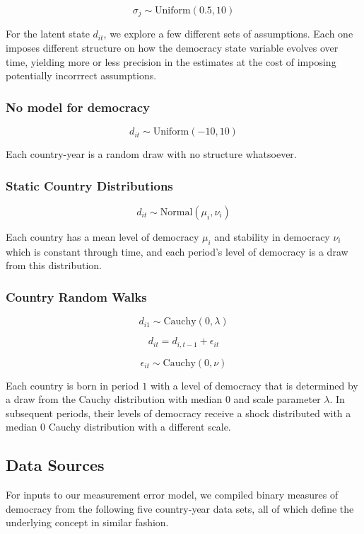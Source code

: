 \documentclass[letterpaper]{article}
\begin{document}
\[ \sigma_j \sim \mbox{Uniform}(0.5, 10) \]

For the latent state $d_{it}$, we explore a few different sets of assumptions.  Each one imposes different structure on how the democracy state variable evolves over time, yielding more or less precision in the estimates at the cost of imposing potentially incorrrect assumptions.

\subsubsection{No model for democracy}

\[
  d_{it} \sim \mbox{Uniform}(-10, 10)
\]

Each country-year is a random draw with no structure whatsoever.

\subsubsection{Static Country Distributions}

\[
  d_{it} \sim \mbox{Normal}(\mu_i, \nu_i)
\]


Each country has a mean level of democracy $\mu_i$ and stability in democracy $\nu_i$ which is constant through time, and each period's level of democracy is a draw from this distribution.

\subsubsection{Country Random Walks}

\[
  d_{i1} \sim \mbox{Cauchy}(0, \lambda)
\]

\[
  d_{it} = d_{i,t-1} + \epsilon_{it}
\]

\[
  \epsilon_{it} \sim \mbox{Cauchy}(0, \nu)
\]

Each country is born in period $1$ with a level of democracy that is determined by a draw from the Cauchy distribution with median 0 and scale parameter $\lambda$.  In subsequent periods, their levels of democracy receive a shock distributed with a median $0$ Cauchy distribution with a different scale. 

\subsection{Data Sources}

For inputs to our measurement error model, we compiled binary measures of democracy from the following five country-year data sets, all of which define the underlying concept in similar fashion.
\end{document}
